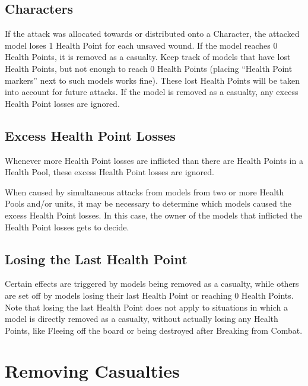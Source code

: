 \subsection{Characters}

If the attack was allocated towards or distributed onto a Character, the attacked model loses 1 Health Point for each unsaved wound. If the model reaches 0 Health Points, it is removed as a casualty. Keep track of models that have lost Health Points, but not enough to reach 0 Health Points (placing \enquote{Health Point markers} next to such models works fine). These lost Health Points will be taken into account for future attacks. If the model is removed as a casualty, any excess Health Point losses are ignored.

\subsection{Excess Health Point Losses}

Whenever more Health Point losses are inflicted than there are Health Points in a Health Pool, these excess Health Point losses are ignored.

When caused by simultaneous attacks from models from two or more Health Pools and/or units, it may be necessary to determine which models caused the excess Health Point losses. In this case, the owner of the models that inflicted the Health Point losses gets to decide.

\subsection{Losing the Last Health Point}

Certain effects are triggered by models being removed as a casualty, while others are set off by models losing their last Health Point or reaching 0 Health Points. Note that losing the last Health Point does not apply to situations in which a model is directly removed as a casualty, without actually losing any Health Points, like Fleeing off the board or being destroyed after Breaking from Combat.


\section{Removing Casualties}
\label{removing_casualties}

